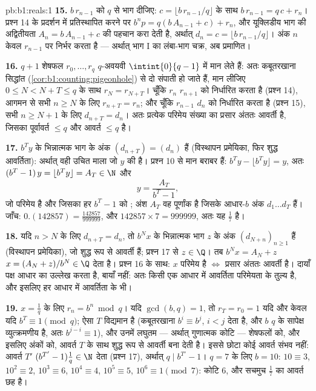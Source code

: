 \begin{solution}{pb:b1:reals:1}
\textbf{15.} $b\,r_{n-1}$ को $q$ से भाग दीजिए: $c = \lfloor b\,r_{n-1}/q
\rfloor$ के साथ $b\,r_{n-1} = q\,c + r_n$। प्रश्न 14 के प्रदर्शन में
प्रतिस्थापित करने पर $b^n p = q(b\,A_{n-1} + c) + r_n$, और यूक्लिडीय भाग की
अद्वितीयता $A_n = b\,A_{n-1} + c$ की पहचान करा देती है, अर्थात् $d_n = c =
\lfloor b\,r_{n-1}/q \rfloor$। अंक $n$ केवल $r_{n-1}$ पर निर्भर करता है ---
अर्थात् भाग I का लंबा-भाग चक्र, अब प्रमाणित।

\textbf{16.} $q + 1$ शेषफल $r_0, \dots, r_q$ $q$-अवयवी 
$\intint{0}{q-1}$ में मान लेते हैं: अतः कबूतरखाना सिद्धांत
(\cref{cor:b1:counting:pigeonhole}) से दो संपाती हो जाते हैं, मान लीजिए $0
\leq N < N + T \leq q$ के साथ $r_N = r_{N+T}$। चूँकि $r_n$ $r_{n+1}$ को
निर्धारित करता है (प्रश्न 14), आगमन से सभी $n \geq N$ के लिए $r_{n+T} =
r_n$; और चूँकि $r_{n-1}$ $d_n$ को निर्धारित करता है (प्रश्न 15), सभी $n \geq
N + 1$ के लिए $d_{n+T} = d_n$। अतः प्रत्येक परिमेय संख्या का प्रसार अंततः
आवर्ती है, जिसका पूर्वावर्त $\leq q$ और आवर्त $\leq q$ है।

\textbf{17.} $b^T y$ के भिन्नात्मक भाग के अंक $(d_{n+T}) = (d_n)$ हैं
(विस्थापन प्रमेयिका, फिर शुद्ध आवर्तिता): अर्थात् वही उचित माला जो $y$ की
है। प्रश्न 10 से मान बराबर हैं: $b^T y - \lfloor b^T y \rfloor = y$, अतः
$(b^T - 1)\,y = \lfloor b^T y \rfloor = A_T \in \N$ और
\[
y = \frac{A_T}{b^T - 1} ,
\]
जो परिमेय है और जिसका हर $b^T - 1$ को ; अंश $A_T$ वह पूर्णांक
है जिसके आधार-$b$ अंक $d_1 \dots d_T$ हैं। जाँच: $0.(142857) =
\frac{142857}{999999}$, और $142857 \times 7 = 999999$, अतः यह $\frac 17$ है।

\textbf{18.} यदि $n > N$ के लिए $d_{n+T} = d_n$, तो $b^N x$ के भिन्नात्मक
भाग $z$ के अंक $(d_{N+n})_{n\geq1}$ हैं (विस्थापन प्रमेयिका), जो शुद्ध रूप
से आवर्ती हैं; प्रश्न 17 से $z \in \Q$। तब $b^N x = A_N + z$ $x = (A_N +
z)/b^N \in \Q$ देता है। प्रश्न 16 के साथ: $x$ परिमेय है $\iff$ प्रसार अंततः
आवर्ती है। दायाँ पक्ष आधार का उल्लेख करता है, बायाँ नहीं: अतः किसी एक आधार
में आवर्तिता परिमेयता के तुल्य है, और इसलिए हर आधार में आवर्तिता के भी।

\textbf{19.} $x = \frac 1q$ के लिए $r_n = b^n \bmod q$। यदि $\gcd(b, q) =
1$, तो $r_T = r_0 = 1$ यदि और केवल यदि $b^T \equiv 1 \pmod q$; ऐसा $T$
विद्यमान है (कबूतरखाना $b^i \equiv b^j$, $i < j$ देता है, और $b$ $q$ के
सापेक्ष व्युत्क्रमणीय है, अतः $b^{j-i} \equiv 1$), और उनमें लघुतम ---
अर्थात् गुणात्मक कोटि --- शेषफलों को, और इसलिए अंकों को, आवर्त $T$ के साथ
शुद्ध रूप से आवर्ती बना देती है। इससे छोटा कोई आवर्त संभव नहीं: आवर्त $T'$
$(b^{T'} - 1)\frac1q \in \N$ देता (प्रश्न 17), अर्थात् $q \mid b^{T'} - 1$।
$q = 7$ के लिए $b = 10$: $10 \equiv 3$, $10^2 \equiv 2$, $10^3 \equiv 6$,
$10^4 \equiv 4$, $10^5 \equiv 5$, $10^6 \equiv 1 \pmod 7$: कोटि $6$, और
सचमुच $\frac 17$ का आवर्त छह है।


\end{solution}
